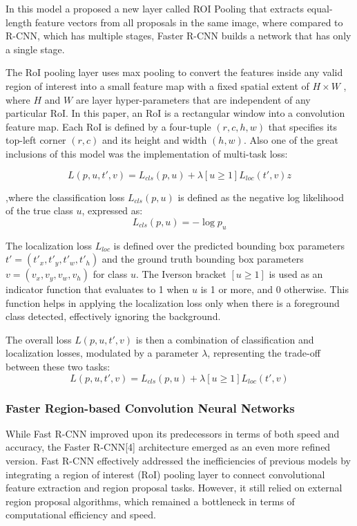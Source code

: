 In this model a proposed a new layer called ROI Pooling that extracts equal-length feature vectors from all proposals in the same image, where 
compared to R-CNN, which has multiple stages, Faster R-CNN builds a network that has only a single stage. 

\newpage
The RoI pooling layer uses max pooling to convert the features inside any valid region of interest into a small feature map with a fixed spatial 
extent of \(H \times W\) , where $H$ and $W$ are layer hyper-parameters that are independent of any particular RoI. In this paper, an RoI is a rectangular window 
into a convolution feature map. Each RoI is defined by a four-tuple \((r, c, h, w)\) that specifies its top-left corner \((r, c)\) and its height 
and width \((h, w)\). Also one of the great inclusions of this model was the implementation of multi-task loss:

\[L(p, u, t', v) = L_{cls}(p, u) + \lambda [u \geq 1] L_{loc}(t', v)z\]

,where the classification loss \(L_{cls}(p, u)\) is defined as the negative log likelihood of the true class \(u\), expressed as:
\[
L_{cls}(p, u) = -\log p_u
\]

The localization loss \(L_{loc}\) is defined over the predicted bounding box parameters \(t' = (t'_x, t'_y, t'_w, t'_h)\) and the ground truth bounding 
box parameters \(v = (v_x, v_y, v_w, v_h)\) for class \(u\). The Iverson bracket \([u \geq 1]\) is used as an indicator function that evaluates to 1 
when \(u\) is 1 or more, and 0 otherwise. This function helps in applying the localization loss only when there is a foreground class detected, 
effectively ignoring the background.

The overall loss \(L(p, u, t', v)\) is then a combination of classification and localization losses, modulated by a parameter \(\lambda\), representing the trade-off between these two tasks:
\[
L(p, u, t', v) = L_{cls}(p, u) + \lambda [u \geq 1] L_{loc}(t', v)
\]

\newpage
\subsubsection{Faster Region-based Convolution Neural Networks}

While Fast R-CNN improved upon its predecessors in terms of both speed and accuracy, the Faster R-CNN[4] architecture emerged as an even more refined version. 
Fast R-CNN effectively addressed the inefficiencies of previous models by integrating a region of interest (RoI) pooling layer to connect convolutional 
feature extraction and region proposal tasks. However, it still relied on external region proposal algorithms, which remained a bottleneck in terms of 
computational efficiency and speed. 

